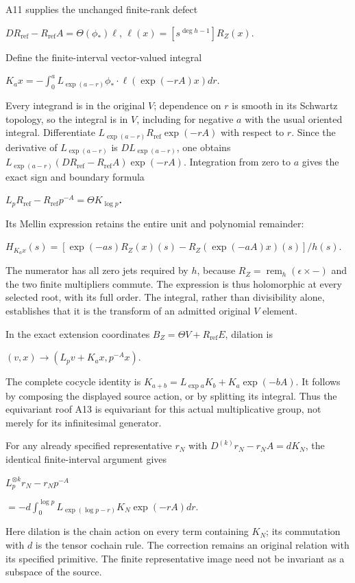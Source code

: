 A11 supplies the unchanged finite-rank defect

\(D R_{\mathrm{ref}}-R_{\mathrm{ref}} A=\Theta(\phi_*) \ell\), \(\ell(x)=[s^{\deg h-1}]R_Z(x)\).

Define the finite-interval vector-valued integral

\(K_a x=-\int_0^a L_{\exp(a-r)}\phi_* \cdot  \ell(\exp(-rA)x) dr\).

Every integrand is in the original \(V\); dependence on \(r\) is smooth in its Schwartz topology, so the integral is in \(V\), including for negative \(a\) with the usual oriented integral. Differentiate \(L_{\exp(a-r)} R_{\mathrm{ref}} \exp(-rA)\) with respect to \(r\). Since the derivative of \(L_{\exp(a-r)}\) is \(D L_{\exp(a-r)}\), one obtains \(L_{\exp(a-r)}(D R_{\mathrm{ref}}-R_{\mathrm{ref}} A)\exp(-rA)\). Integration from zero to \(a\) gives the exact sign and boundary formula

\textbf{\(L_p R_{\mathrm{ref}}-R_{\mathrm{ref}} p^{-A}=\Theta K_{\log p}\).}

Its Mellin expression retains the entire unit and polynomial remainder:

\(H_{K_a x}(s)=[\exp(-as)R_Z(x)(s)-R_Z(\exp(-aA)x)(s)]/h(s)\).

The numerator has all zero jets required by \(h\), because \(R_Z=\operatorname{rem}_h(\epsilon\times\mathord{-})\) and the two finite multipliers commute. The expression is thus holomorphic at every selected root, with its full order. The integral, rather than divisibility alone, establishes that it is the transform of an admitted original \(V\) element.

In the exact extension coordinates \(B_Z=\Theta V+R_{\mathrm{ref}} E\), dilation is

\((v,x)\to (L_p v+K_a x,p^{-A}x)\).

The complete cocycle identity is \(K_{a+b}=L_{\exp a}K_b+K_a \exp(-bA)\). It follows by composing the displayed source action, or by splitting its integral. Thus the equivariant roof A13 is equivariant for this actual multiplicative group, not merely for its infinitesimal generator.

For any already specified representative \(r_N\) with \(D^{(k)}r_N-r_NA=dK_N\), the identical finite-interval argument gives

\(L_p^{\otimes k}r_N-r_Np^{-A}\)

\(=-d \int_0^{\log p} L_{\exp(\log p-r)} K_N \exp(-rA)dr\).

Here dilation is the chain action on every term containing \(K_N\); its commutation with \(d\) is the tensor cochain rule. The correction remains an original relation with its specified primitive. The finite representative image need not be invariant as a subspace of the source.

